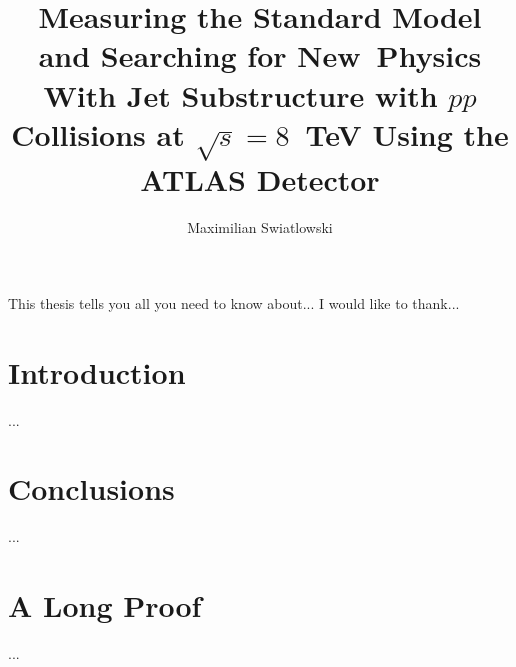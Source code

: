 \documentclass{report}
\begin{document}
\title{Measuring the Standard Model and Searching for New~Physics 
        With Jet Substructure with $pp$ Collisions at $\sqrt{s} = 8$~TeV Using the ATLAS Detector}
\author{Maximilian Swiatlowski}
 
\beforepreface
{}
    This thesis tells you all you need to know about...
    I would like to thank...
\afterpreface
 
\chapter{Introduction}
         ...
\chapter{Conclusions}
         ...
\appendix
\chapter{A Long Proof}
         ...
%
%
\end{document}

